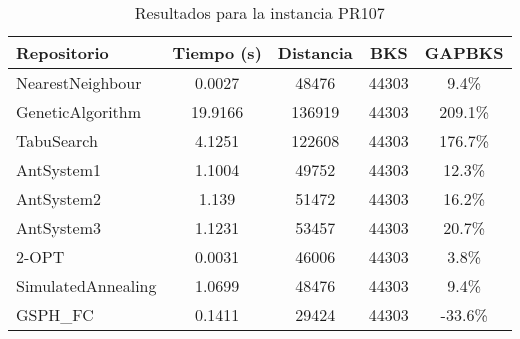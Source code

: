 \begin{table}[H]
\centering
\caption{Resultados para la instancia PR107}
\begin{tabular}{|l|c|c|c|c|}
\hline
\textbf{Repositorio} & \textbf{Tiempo (s)} & \textbf{Distancia} & \textbf{BKS} & \textbf{GAPBKS} \\ 
\hline
NearestNeighbour & 0.0027 & 48476 & 44303 & 9.4\% \\ 
GeneticAlgorithm & 19.9166 & 136919 & 44303 & 209.1\% \\ 
TabuSearch & 4.1251 & 122608 & 44303 & 176.7\% \\ 
AntSystem1 & 1.1004 & 49752 & 44303 & 12.3\% \\ 
AntSystem2 & 1.139 & 51472 & 44303 & 16.2\% \\ 
AntSystem3 & 1.1231 & 53457 & 44303 & 20.7\% \\ 
2-OPT & 0.0031 & 46006 & 44303 & 3.8\% \\ 
SimulatedAnnealing & 1.0699 & 48476 & 44303 & 9.4\% \\ 
GSPH_FC & 0.1411 & 29424 & 44303 & -33.6\% \\ 
\hline
\end{tabular}
\end{table}
